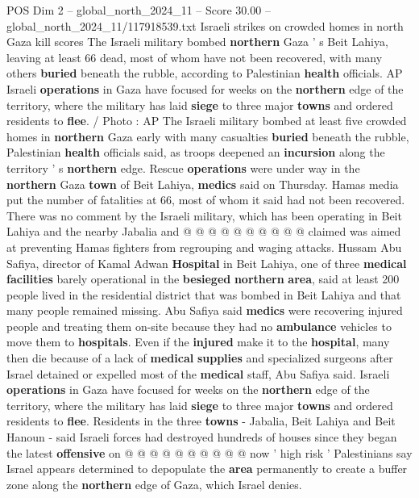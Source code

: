 \begin{textsample}{POS Dim 2 – global\_north\_2024\_11 – Score 30.00 – global\_north\_2024\_11/117918539.txt}  \label{ex:f2_pos_354}
Israeli strikes on crowded homes in north Gaza kill scores The Israeli military bombed \textbf{northern} Gaza ' s Beit Lahiya, leaving at least 66 dead, most of whom have not been recovered, with many others \textbf{buried} beneath the rubble, according to Palestinian \textbf{health} officials.
AP Israeli \textbf{operations} in Gaza have focused for weeks on the \textbf{northern} edge of the territory, where the military has laid \textbf{siege} to three major \textbf{towns} and ordered residents to \textbf{flee}. / Photo : AP The Israeli military bombed at least five crowded homes in \textbf{northern} Gaza early with many casualties \textbf{buried} beneath the rubble, Palestinian \textbf{health} officials said, as troops deepened an \textbf{incursion} along the territory ' s \textbf{northern} edge.
Rescue \textbf{operations} were under way in the \textbf{northern} Gaza \textbf{town} of Beit Lahiya, \textbf{medics} said on Thursday.
Hamas media put the number of fatalities at 66, most of whom it said had not been recovered.
There was no comment by the Israeli military, which has been operating in Beit Lahiya and the nearby Jabalia and @ @ @ @ @ @ @ @ @ @ claimed was aimed at preventing Hamas fighters from regrouping and waging attacks.
Hussam Abu Safiya, director of Kamal Adwan \textbf{Hospital} in Beit Lahiya, one of three \textbf{medical} \textbf{facilities} barely operational in the \textbf{besieged} \textbf{northern} \textbf{area}, said at least 200 people lived in the residential district that was bombed in Beit Lahiya and that many people remained missing.
Abu Safiya said \textbf{medics} were recovering injured people and treating them on-site because they had no \textbf{ambulance} vehicles to move them to \textbf{hospitals}.
Even if the \textbf{injured} make it to the \textbf{hospital}, many then die because of a lack of \textbf{medical} \textbf{supplies} and specialized surgeons after Israel detained or expelled most of the \textbf{medical} staff, Abu Safiya said.
Israeli \textbf{operations} in Gaza have focused for weeks on the \textbf{northern} edge of the territory, where the military has laid \textbf{siege} to three major \textbf{towns} and ordered residents to \textbf{flee}.
Residents in the three \textbf{towns} - Jabalia, Beit Lahiya and Beit Hanoun - said Israeli forces had destroyed hundreds of houses since they began the latest \textbf{offensive} on @ @ @ @ @ @ @ @ @ @ now ' high risk ' Palestinians say Israel appears determined to depopulate the \textbf{area} permanently to create a buffer zone along the \textbf{northern} edge of Gaza, which Israel denies.

\end{textsample}
